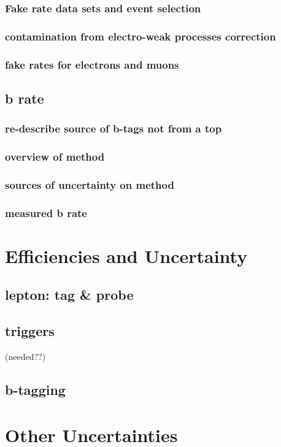 \documentclass[12pt,chapterheads,oneside]{ucsd}
\begin{document}
        		\subsection{Fake rate data sets and event selection}
        		\subsection{contamination from electro-weak processes correction}
        		\subsection{fake rates for electrons and muons}
	\section{b rate}
        		\subsection{re-describe source of b-tags not from a top}
        		\subsection{overview of method}
        		\subsection{sources of uncertainty on method}
        		\subsection{measured b rate}

\chapter{Efficiencies and Uncertainty}
	\section{lepton: tag \& probe}
	\section{triggers}         (needed??)
	\section{b-tagging}

\chapter{Other Uncertainties}
\end{document}
